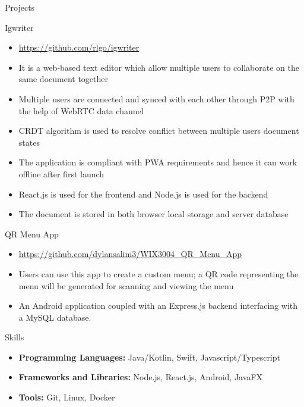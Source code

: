 \documentclass[]{mcdowellcv}
\begin{document}
\begin{cvsection}{Projects}
	\begin{cvsubsection}{Igwriter}{}{}
		\begin{itemize}
			\item \url{https://github.com/rlgo/igwriter}
			\item It is a web-based text editor which allow multiple users to collaborate on the same document together
			\item Multiple users are connected and synced with each other through P2P with the help of WebRTC data channel
			\item CRDT algorithm is used to resolve conflict between multiple users document states
			\item The application is compliant with PWA requirements and hence it can work offline after first launch
			\item React.js is used for the frontend and Node.js is used for the backend
			\item The document is stored in both browser local storage and server database
		\end{itemize}
	\end{cvsubsection}
	\begin{cvsubsection}{QR Menu App}{}{}
		\begin{itemize}
			\item \url{https://github.com/dylansalim3/WIX3004\_QR\_Menu\_App}
			\item Users can use this app to create a custom menu; a QR code representing the menu will be generated for scanning and viewing the menu
			\item An Android application coupled with an Express.js backend interfacing with a MySQL database.
		\end{itemize}
	\end{cvsubsection}
\end{cvsection}
\begin{cvsection}{Skills}
	\begin{cvsubsection}{}{}{}
		\begin{itemize}
			\item \textbf{Programming Languages:}  Java/Kotlin, Swift, Javascript/Typescript
			\item \textbf{Frameworks and Libraries:}  Node.js, React.js, Android, JavaFX
			\item \textbf{Tools:}  Git, Linux, Docker
		\end{itemize}
	\end{cvsubsection}
\end{cvsection}
\end{document}
